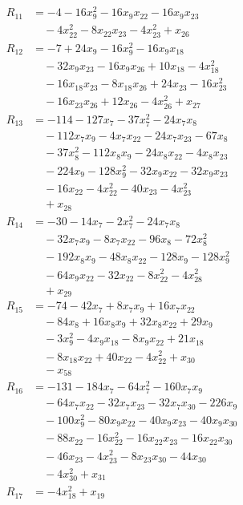 \begin{align*}
R_{11}&=-4-16x_{9}^{2}-16x_{9}x_{22}-16x_{9}x_{23}\\
&\quad{}-4x_{22}^{2}-8x_{22}x_{23}-4x_{23}^{2}+x_{26}\\
R_{12}&=-7+24x_{9}-16x_{9}^{2}-16x_{9}x_{18}\\
&\quad{}-32x_{9}x_{23}-16x_{9}x_{26}+10x_{18}-4x_{18}^{2}\\
&\quad{}-16x_{18}x_{23}-8x_{18}x_{26}+24x_{23}-16x_{23}^{2}\\
&\quad{}-16x_{23}x_{26}+12x_{26}-4x_{26}^{2}+x_{27}\\
R_{13}&=-114-127x_{7}-37x_{7}^{2}-24x_{7}x_{8}\\
&\quad{}-112x_{7}x_{9}-4x_{7}x_{22}-24x_{7}x_{23}-67x_{8}\\
&\quad{}-37x_{8}^{2}-112x_{8}x_{9}-24x_{8}x_{22}-4x_{8}x_{23}\\
&\quad{}-224x_{9}-128x_{9}^{2}-32x_{9}x_{22}-32x_{9}x_{23}\\
&\quad{}-16x_{22}-4x_{22}^{2}-40x_{23}-4x_{23}^{2}\\
&\quad{}+x_{28}\\
R_{14}&=-30-14x_{7}-2x_{7}^{2}-24x_{7}x_{8}\\
&\quad{}-32x_{7}x_{9}-8x_{7}x_{22}-96x_{8}-72x_{8}^{2}\\
&\quad{}-192x_{8}x_{9}-48x_{8}x_{22}-128x_{9}-128x_{9}^{2}\\
&\quad{}-64x_{9}x_{22}-32x_{22}-8x_{22}^{2}-4x_{28}^{2}\\
&\quad{}+x_{29}\\
R_{15}&=-74-42x_{7}+8x_{7}x_{9}+16x_{7}x_{22}\\
&\quad{}-84x_{8}+16x_{8}x_{9}+32x_{8}x_{22}+29x_{9}\\
&\quad{}-3x_{9}^{2}-4x_{9}x_{18}-8x_{9}x_{22}+21x_{18}\\
&\quad{}-8x_{18}x_{22}+40x_{22}-4x_{22}^{2}+x_{30}\\
&\quad{}-x_{58}\\
R_{16}&=-131-184x_{7}-64x_{7}^{2}-160x_{7}x_{9}\\
&\quad{}-64x_{7}x_{22}-32x_{7}x_{23}-32x_{7}x_{30}-226x_{9}\\
&\quad{}-100x_{9}^{2}-80x_{9}x_{22}-40x_{9}x_{23}-40x_{9}x_{30}\\
&\quad{}-88x_{22}-16x_{22}^{2}-16x_{22}x_{23}-16x_{22}x_{30}\\
&\quad{}-46x_{23}-4x_{23}^{2}-8x_{23}x_{30}-44x_{30}\\
&\quad{}-4x_{30}^{2}+x_{31}\\
R_{17}&=-4x_{18}^{2}+x_{19}\\

\end{align*}
